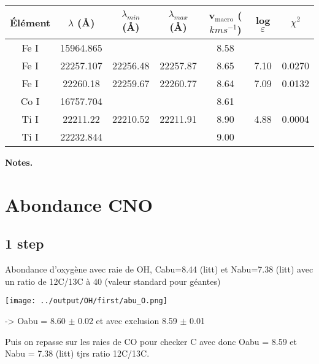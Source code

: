 \documentclass{article}
\begin{document}
\begin{table}[h!]
\vspace{0.3cm}

\begin{center}
	\begin{tabular}{ccccccc}
        \hline
		\hline
        Élément & $\lambda$ (Å) & $\lambda_{min}$ (Å) & $\lambda_{max}$ (Å)& v$_{\mathrm{macro}}$ ($km s^{-1}$) & log $\varepsilon$ & $\chi^2$\\
        \hline
    Fe I & 15964.865 &&& 8.58 && \\
    Fe I & 22257.107 &22256.48&22257.87& 8.65 &7.10& 0.0270\\
    Fe I & 22260.18 &22259.67&22260.77& 8.64 & 7.09 & 0.0132\\
		Co I & 16757.704&& & 8.61 && \\
		Ti I & 22211.22 & 22210.52 & 22211.91 & 8.90 & 4.88 & 0.0004\\
		Ti I & 22232.844&& & 9.00 &&\\
    \end{tabular}
\end{center} 
\textbf{Notes.} 
\label{macro}
\end{table}

\section{Abondance CNO}
\subsection{1 step} 
Abondance d'oxygène avec raie de OH, Cabu=8.44 (litt) et Nabu=7.38 (litt) 
avec un ratio de 12C/13C à 40 (valeur standard pour géantes)

\begin{center}
  \texttt{[image: ../output/OH/first/abu\_O.png]}
\end{center} 

-> Oabu = 8.60 $\pm$ 0.02 et avec exclusion 8.59 $\pm$ 0.01

Puis on repasse sur les raies de CO pour checker C avec donc Oabu = 8.59 et Nabu = 7.38 (litt)
tjrs ratio 12C/13C. 
\end{document}
